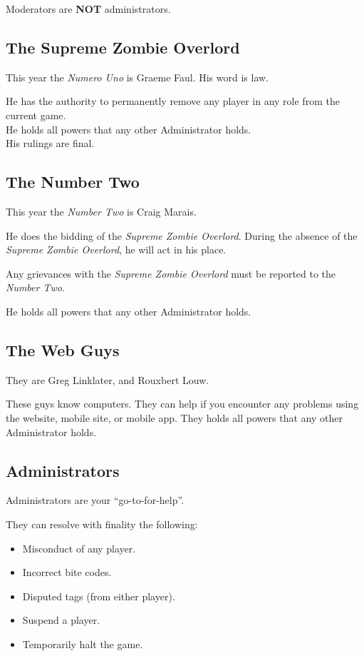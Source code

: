\documentclass[a4paper,12pt]{article}
\newcommand{\theMainGuy}{Graeme Faul}
\newcommand{\theWebDude}{Greg Linklater}
\newcommand{\theOtherWebdude}{Rouxbert Louw}
\begin{document}
Moderators are {\bf NOT} administrators.

\subsection{The Supreme Zombie Overlord}

This year the \emph{Numero Uno} is \theMainGuy.
His word is law.

He has the authority to permanently remove any player in any role from the current game.\\

He holds all powers that any other Administrator holds.\\

His rulings are final.

\subsection{The Number Two}

This year the \emph{Number Two} is Craig Marais.

He does the bidding of the \emph{Supreme Zombie Overlord}. During the absence of the \emph{Supreme Zombie Overlord}, he will act in his place.

Any grievances with the \emph{Supreme Zombie Overlord} must be reported to the \emph{Number Two}.

He holds all powers that any other Administrator holds.

\subsection{The Web Guys}
They are \theWebDude, and \theOtherWebdude.

These guys know computers. They can help if you encounter any problems using the website, mobile site, or mobile app.
They holds all powers that any other Administrator holds.

\subsection{Administrators}

Administrators are your ``go-to-for-help''.

They can resolve with finality the following:

\begin{itemize}
    \item {Misconduct of any player.}
    \item {Incorrect bite codes.}
    \item {Disputed tags (from either player).}
    \item {Suspend a player.}
    \item {Temporarily halt the game.}
\end{itemize}
\end{document}
